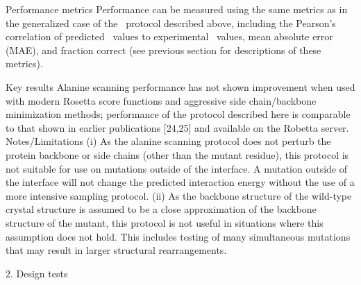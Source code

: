 Performance metrics
Performance can be measured using the same metrics as in the generalized case of the \ddg\ protocol described above, including the Pearson’s correlation of predicted \ddg\ values to experimental \ddg\ values, mean absolute error (MAE), and fraction correct (see previous section for descriptions of these metrics).

Key results
Alanine scanning performance has not shown improvement when used with modern Rosetta score functions and aggressive side chain/backbone minimization methods; performance of the protocol described here is comparable to that shown in earlier publications [24,25] and available on the Robetta server.
Notes/Limitations
(i) As the alanine scanning protocol does not perturb the protein backbone or side chains (other than the mutant residue), this protocol is not suitable for use on mutations outside of the interface. A mutation outside of the interface will not change the predicted interaction energy without the use of a more intensive sampling protocol. (ii) As the backbone structure of the wild-type crystal structure is assumed to be a close approximation of the backbone structure of the mutant, this protocol is not useful in situations where this assumption does not hold. This includes testing of many simultaneous mutations that may result in larger structural rearrangements.

2. Design tests

